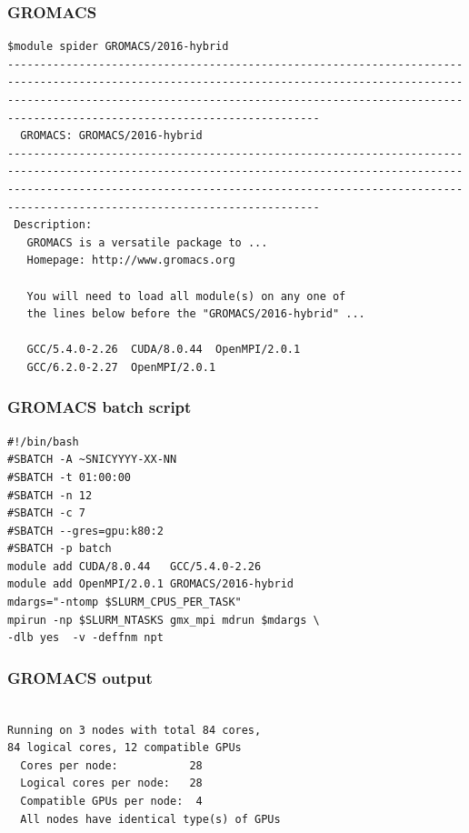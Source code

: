 \begin{frame}[fragile]
	\frametitle{GROMACS}
  
        \begin{verbatim}             
$module spider GROMACS/2016-hybrid 
------------------------------------------------------------------------------------------------------------------------------------------------------------------------------------------------------------------------------------------------------------------
  GROMACS: GROMACS/2016-hybrid
------------------------------------------------------------------------------------------------------------------------------------------------------------------------------------------------------------------------------------------------------------------
 Description:
   GROMACS is a versatile package to ... 
   Homepage: http://www.gromacs.org 

   You will need to load all module(s) on any one of 
   the lines below before the "GROMACS/2016-hybrid" ...

   GCC/5.4.0-2.26  CUDA/8.0.44  OpenMPI/2.0.1
   GCC/6.2.0-2.27  OpenMPI/2.0.1

        \end{verbatim}

\end{frame}


\begin{frame}[fragile]
	\frametitle{GROMACS batch script}
        \begin{verbatim}             
#!/bin/bash
#SBATCH -A ~SNICYYYY-XX-NN
#SBATCH -t 01:00:00
#SBATCH -n 12
#SBATCH -c 7
#SBATCH --gres=gpu:k80:2
#SBATCH -p batch
module add CUDA/8.0.44   GCC/5.4.0-2.26   
module add OpenMPI/2.0.1 GROMACS/2016-hybrid
mdargs="-ntomp $SLURM_CPUS_PER_TASK"
mpirun -np $SLURM_NTASKS gmx_mpi mdrun $mdargs \ 
-dlb yes  -v -deffnm npt
        \end{verbatim}
\end{frame}



\begin{frame}[fragile]
	\frametitle{GROMACS output}
  
        \begin{verbatim}             
    
Running on 3 nodes with total 84 cores, 
84 logical cores, 12 compatible GPUs
  Cores per node:           28                                          
  Logical cores per node:   28                 
  Compatible GPUs per node:  4                 
  All nodes have identical type(s) of GPUs  

        \end{verbatim}

\end{frame}


